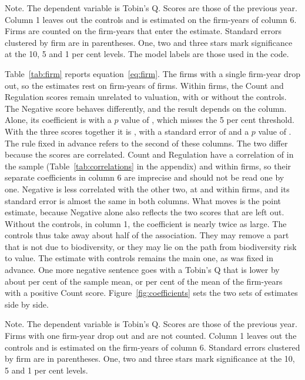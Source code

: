 \documentclass[12pt,a4paper]{article}
\newcommand{\tablenote}[1]{\par\smallskip\begin{minipage}{\linewidth}\footnotesize\setstretch{1.05}#1\end{minipage}}
\newcommand{\widetable}[1]{\resizebox{\ifdim\width>\linewidth\linewidth\else\width\fi}{!}{}}
\begin{document}
\begin{table}[!htbp]
\centering\small
\caption{Biodiversity scores and Tobin's Q with industry-by-year effects}\label{tab:baseline}
\widetable{tables/tab_baseline}
\tablenote{Note. The dependent variable is Tobin's Q. Scores are those of the previous year. Column 1 leaves out the controls and is estimated on the firm-years of column 6. Firms are counted on the firm-years that enter the estimate. Standard errors clustered by firm are in parentheses. One, two and three stars mark significance at the 10, 5 and 1 per cent levels. The model labels are those used in the code.}
\end{table}

Table~\ref{tab:firm} reports equation~\eqref{eq:firm}. The \nFirmsOnce{} firms with a single firm-year drop out, so the estimates rest on \nObsF{} firm-years of \nFirmsF{} firms. Within firms, the Count and Regulation scores remain unrelated to valuation, with or without the controls. The Negative score behaves differently, and the result depends on the column. Alone, its coefficient is \coefFNeg{} with a $p$ value of \pvalFNeg{}, which misses the 5 per cent threshold. With the three scores together it is \coefFAllNeg{}, with a standard error of \seFAllNeg{} and a $p$ value of \pvalFAllNeg{}. The rule fixed in advance refers to the second of these columns. The two differ because the scores are correlated. Count and Regulation have a correlation of \corrCountReg{} in the sample (Table~\ref{tab:correlations} in the appendix) and \corrInCountReg{} within firms, so their separate coefficients in column 6 are imprecise and should not be read one by one. Negative is less correlated with the other two, at \corrInCountNeg{} and \corrInNegReg{} within firms, and its standard error is almost the same in both columns. What moves is the point estimate, because Negative alone also reflects the two scores that are left out. Without the controls, in column 1, the coefficient is nearly twice as large. The controls thus take away about half of the association. They may remove a part that is not due to biodiversity, or they may lie on the path from biodiversity risk to value. The estimate with controls remains the main one, as was fixed in advance. One more negative sentence goes with a Tobin's Q that is lower by about \effNegMean{} per cent of the sample mean, or \effNegDisc{} per cent of the mean of the firm-years with a positive Count score. Figure~\ref{fig:coefficients} sets the two sets of estimates side by side.

\begin{table}[!htbp]
\centering\small
\caption{Biodiversity scores and Tobin's Q with firm and year effects}\label{tab:firm}
\widetable{tables/tab_firm_effects}
\tablenote{Note. The dependent variable is Tobin's Q. Scores are those of the previous year. Firms with one firm-year drop out and are not counted. Column 1 leaves out the controls and is estimated on the firm-years of column 6. Standard errors clustered by firm are in parentheses. One, two and three stars mark significance at the 10, 5 and 1 per cent levels.}
\end{table}
\end{document}
